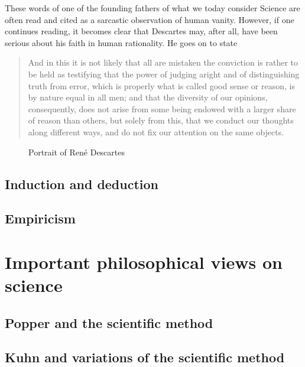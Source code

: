 \documentclass{tufte-book}
\begin{document}
These words of one of the founding fathers of what we today consider Science are often read and cited as a sarcastic observation of human vanity. However, if one continues reading, it becomes clear that Descartes may, after all, have been serious about his faith in human rationality. He goes on to state

\begin{quote}
And in this it is not likely that all are mistaken the conviction is rather to be held as testifying that the power of judging aright and of distinguishing truth from error, which is properly what is called good sense or reason, is by nature equal in all men; and that the diversity of our opinions, consequently, does not arise from some being endowed with a larger share of reason than others, but solely from this, that we conduct our thoughts along different ways, and do not fix our attention on the same objects. 
\end{quote}


\begin{figure}[]
\begin{center}
\caption{Portrait of René Descartes}
\label{fig: Descartes}
\end{center}
\end{figure}



\subsection{Induction and deduction}

\subsection{Empiricism}


\section{Important philosophical views on science}


\subsection{Popper and the scientific method}


\subsection{Kuhn and variations of the scientific method}
\end{document}
